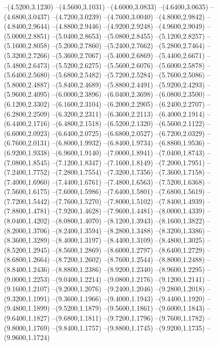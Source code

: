 {	--(4.5200,3.1230)
	--(4.5600,3.1031)
	--(4.6000,3.0833)
	--(4.6400,3.0635)
	--(4.6800,3.0437)
	--(4.7200,3.0239)
	--(4.7600,3.0040)
	--(4.8000,2.9842)
	--(4.8400,2.9644)
	--(4.8800,2.9446)
	--(4.9200,2.9248)
	--(4.9600,2.9049)
	--(5.0000,2.8851)
	--(5.0400,2.8653)
	--(5.0800,2.8455)
	--(5.1200,2.8257)
	--(5.1600,2.8058)
	--(5.2000,2.7860)
	--(5.2400,2.7662)
	--(5.2800,2.7464)
	--(5.3200,2.7266)
	--(5.3600,2.7067)
	--(5.4000,2.6869)
	--(5.4400,2.6671)
	--(5.4800,2.6473)
	--(5.5200,2.6275)
	--(5.5600,2.6076)
	--(5.6000,2.5878)
	--(5.6400,2.5680)
	--(5.6800,2.5482)
	--(5.7200,2.5284)
	--(5.7600,2.5086)
	--(5.8000,2.4887)
	--(5.8400,2.4689)
	--(5.8800,2.4491)
	--(5.9200,2.4293)
	--(5.9600,2.4095)
	--(6.0000,2.3896)
	--(6.0400,2.3698)
	--(6.0800,2.3500)
	--(6.1200,2.3302)
	--(6.1600,2.3104)
	--(6.2000,2.2905)
	--(6.2400,2.2707)
	--(6.2800,2.2509)
	--(6.3200,2.2311)
	--(6.3600,2.2113)
	--(6.4000,2.1914)
	--(6.4400,2.1716)
	--(6.4800,2.1518)
	--(6.5200,2.1320)
	--(6.5600,2.1122)
	--(6.6000,2.0923)
	--(6.6400,2.0725)
	--(6.6800,2.0527)
	--(6.7200,2.0329)
	--(6.7600,2.0131)
	--(6.8000,1.9932)
	--(6.8400,1.9734)
	--(6.8800,1.9536)
	--(6.9200,1.9338)
	--(6.9600,1.9140)
	--(7.0000,1.8941)
	--(7.0400,1.8743)
	--(7.0800,1.8545)
	--(7.1200,1.8347)
	--(7.1600,1.8149)
	--(7.2000,1.7951)
	--(7.2400,1.7752)
	--(7.2800,1.7554)
	--(7.3200,1.7356)
	--(7.3600,1.7158)
	--(7.4000,1.6960)
	--(7.4400,1.6761)
	--(7.4800,1.6563)
	--(7.5200,1.6368)
	--(7.5600,1.6175)
	--(7.6000,1.5986)
	--(7.6400,1.5801)
	--(7.6800,1.5619)
	--(7.7200,1.5442)
	--(7.7600,1.5270)
	--(7.8000,1.5102)
	--(7.8400,1.4939)
	--(7.8800,1.4781)
	--(7.9200,1.4628)
	--(7.9600,1.4481)
	--(8.0000,1.4339)
	--(8.0400,1.4202)
	--(8.0800,1.4070)
	--(8.1200,1.3943)
	--(8.1600,1.3822)
	--(8.2000,1.3706)
	--(8.2400,1.3594)
	--(8.2800,1.3488)
	--(8.3200,1.3386)
	--(8.3600,1.3289)
	--(8.4000,1.3197)
	--(8.4400,1.3109)
	--(8.4800,1.3025)
	--(8.5200,1.2945)
	--(8.5600,1.2869)
	--(8.6000,1.2797)
	--(8.6400,1.2729)
	--(8.6800,1.2664)
	--(8.7200,1.2602)
	--(8.7600,1.2544)
	--(8.8000,1.2488)
	--(8.8400,1.2436)
	--(8.8800,1.2386)
	--(8.9200,1.2340)
	--(8.9600,1.2295)
	--(9.0000,1.2253)
	--(9.0400,1.2214)
	--(9.0800,1.2176)
	--(9.1200,1.2141)
	--(9.1600,1.2107)
	--(9.2000,1.2076)
	--(9.2400,1.2046)
	--(9.2800,1.2018)
	--(9.3200,1.1991)
	--(9.3600,1.1966)
	--(9.4000,1.1943)
	--(9.4400,1.1920)
	--(9.4800,1.1899)
	--(9.5200,1.1879)
	--(9.5600,1.1861)
	--(9.6000,1.1843)
	--(9.6400,1.1827)
	--(9.6800,1.1811)
	--(9.7200,1.1796)
	--(9.7600,1.1782)
	--(9.8000,1.1769)
	--(9.8400,1.1757)
	--(9.8800,1.1745)
	--(9.9200,1.1735)
	--(9.9600,1.1724)
}
